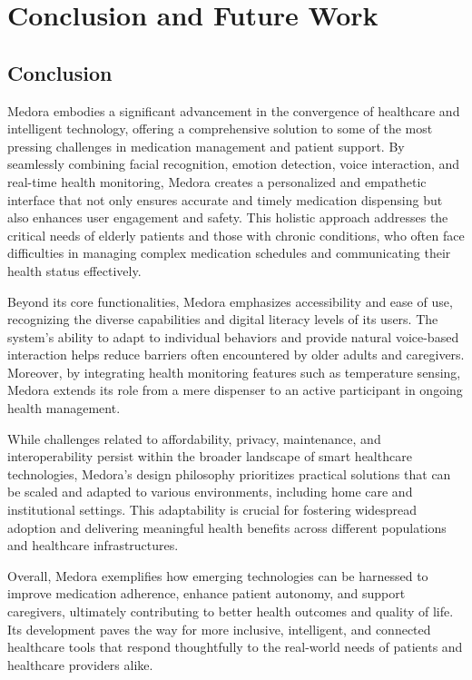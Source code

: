 \chapter{Conclusion and Future Work}

\section{Conclusion}
Medora embodies a significant advancement in the convergence of healthcare and intelligent technology, offering a comprehensive solution to some of the most pressing challenges in medication management and patient support. By seamlessly combining facial recognition, emotion detection, voice interaction, and real-time health monitoring, Medora creates a personalized and empathetic interface that not only ensures accurate and timely medication dispensing but also enhances user engagement and safety. This holistic approach addresses the critical needs of elderly patients and those with chronic conditions, who often face difficulties in managing complex medication schedules and communicating their health status effectively.

Beyond its core functionalities, Medora emphasizes accessibility and ease of use, recognizing the diverse capabilities and digital literacy levels of its users. The system’s ability to adapt to individual behaviors and provide natural voice-based interaction helps reduce barriers often encountered by older adults and caregivers. Moreover, by integrating health monitoring features such as temperature sensing, Medora extends its role from a mere dispenser to an active participant in ongoing health management.

While challenges related to affordability, privacy, maintenance, and interoperability persist within the broader landscape of smart healthcare technologies, Medora’s design philosophy prioritizes practical solutions that can be scaled and adapted to various environments, including home care and institutional settings. This adaptability is crucial for fostering widespread adoption and delivering meaningful health benefits across different populations and healthcare infrastructures.

Overall, Medora exemplifies how emerging technologies can be harnessed to improve medication adherence, enhance patient autonomy, and support caregivers, ultimately contributing to better health outcomes and quality of life. Its development paves the way for more inclusive, intelligent, and connected healthcare tools that respond thoughtfully to the real-world needs of patients and healthcare providers alike.

